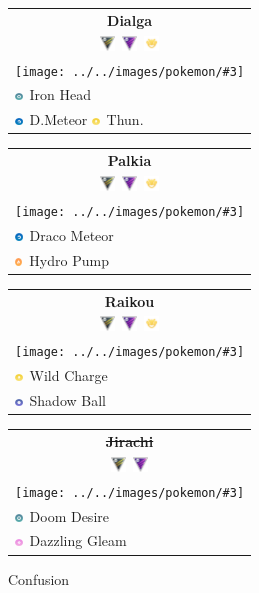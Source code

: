 \documentclass[12pt]{beamer}
\newcommand{\dragonsimp}{\includegraphics[height=0.2cm]{../../images/type/simplified/dragon.png}}
\newcommand{\ghostsimp}{\includegraphics[height=0.2cm]{../../images/type/simplified/ghost.png}}
\newcommand{\electricsimp}{\includegraphics[height=0.2cm]{../../images/type/simplified/electric.png}}
\newcommand{\firesimp}{\includegraphics[height=0.2cm]{../../images/type/simplified/fire.png}}
\newcommand{\steelsimp}{\includegraphics[height=0.2cm]{../../images/type/simplified/steel.png}}
\newcommand{\fairysimp}{\includegraphics[height=0.2cm]{../../images/type/simplified/fairy.png}}
\newcommand{\pokemon}[5]{
\begin{tabular}{p{2.7cm}}
\multicolumn{1}{c}{\textbf{#1}} \\
\multicolumn{1}{c}{#2} \\
\multicolumn{1}{c}{\texttt{[image: ../../images/pokemon/\#3]} } \\
#4 \\ #5 \\  
\end{tabular}
}
\newcommand{\ultraleague}{\includegraphics[width=0.4cm]{../../images/league/ultra_league.png}}
\newcommand{\masterleague}{\includegraphics[width=0.4cm]{../../images/league/master_league.png}}
\newcommand{\raids}{\includegraphics[width=0.4cm]{../../images/league/raids.png}}
\begin{document}
\begin{frame}
\begin{footnotesize}
\begin{block}{}
\begin{center}
\pokemon{Dialga}{\ultraleague~\masterleague~\raids}{dialga}{\steelsimp~Iron Head}{\dragonsimp~D.Meteor \electricsimp~Thun.}
\pokemon{Palkia}{\ultraleague~\masterleague~\raids}{palkia}{\dragonsimp~Draco Meteor}{\firesimp~Hydro Pump}
\pokemon{Raikou}{\ultraleague~\masterleague~\raids}{raikou}{\electricsimp~Wild Charge}{\ghostsimp~Shadow Ball}
\pokemon{\sout{Jirachi}}{\ultraleague~\masterleague}{jirachi}{\steelsimp~Doom Desire}{\fairysimp~Dazzling Gleam}

Confusion






\end{center}
\end{block}

\end{footnotesize}
\end{frame}
\end{document}
